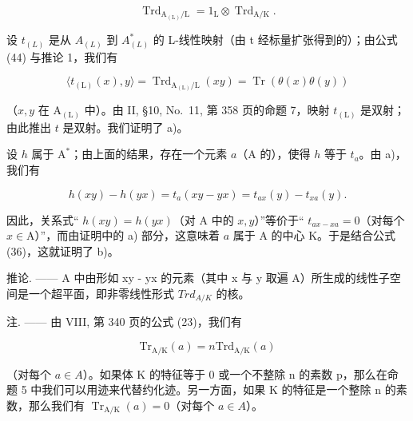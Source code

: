 \[
\operatorname{Trd} _ {\mathrm{A} _ {(\mathrm{L})} / \mathrm{L}} = 1 _ {\mathrm{L}} \otimes \operatorname{Trd} _ {\mathrm{A} / \mathrm{K}}.\tag{44}
\]

设 \(t_{(L)}\) 是从 \(A_{(L)}\) 到 \(A_{(L)}^{*}\) 的 L-线性映射（由 t 经标量扩张得到的）；由公式 (44) 与推论 1，我们有

\[
\langle t _ {(\mathrm{L})} (x), y \rangle = \operatorname{Trd} _ {\mathrm{A} _ {(\mathrm{L})} / \mathrm{L}} (x y) = \operatorname{Tr} (\theta (x) \theta (y))\tag{45}
\]

（\(x, y\) 在 \(\mathrm{A}_{(\mathrm{L})}\) 中）。由 II, §10, No.~11, 第 358 页的命题 7，映射 \(t_{(\mathrm{L})}\) 是双射；由此推出 \(t\) 是双射。我们证明了 a)。

设 \(h\) 属于 \(\mathrm{A}^*\)；由上面的结果，存在一个元素 \(a\)（\(\mathrm{A}\) 的），使得 \(h\) 等于 \(t_a\)。由 a)，我们有

\[
h (x y) - h (y x) = t _ {a} (x y - y x) = t _ {a x} (y) - t _ {x a} (y).
\]

因此，关系式`` \(h(xy) = h(yx)\)（对 A 中的 \(x,y\)）''等价于`` \(t_{ax-xa} = 0\)（对每个 \(x \in \mathrm{A}\)）''，而由证明中的 a) 部分，这意味着 \(a\) 属于 A 的中心 K。于是结合公式 (36)，这就证明了 b)。

推论. —— A 中由形如 xy - yx 的元素（其中 x 与 y 取遍 A）所生成的线性子空间是一个超平面，即非零线性形式 \(Trd_{A/K}\) 的核。

注. —— 由 VIII, 第 340 页的公式 (23)，我们有

\[
\mathrm{Tr} _ {\mathrm{A/K}} (a) = n \mathrm{Trd} _ {\mathrm{A/K}} (a)
\]

（对每个 \(a \in A\)）。如果体 K 的特征等于 0 或一个不整除 n 的素数 p，那么在命题 5 中我们可以用迹来代替约化迹。另一方面，如果 K 的特征是一个整除 n 的素数，那么我们有 \(\operatorname{Tr}_{\mathrm{A}/\mathrm{K}}(a) = 0\)（对每个 \(a \in A\)）。

